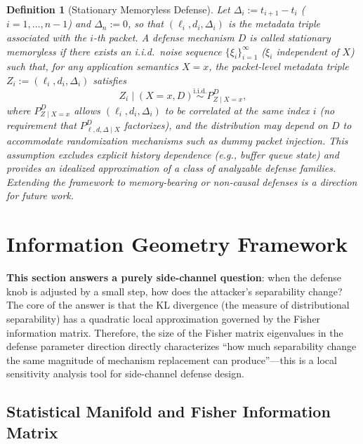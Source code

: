 \documentclass[lettersize,journal]{IEEEtran}
\newtheorem{definition}{Definition}
\begin{document}
\begin{definition}[Stationary Memoryless Defense]\label{def:memoryless-defense}
Let $\Delta_i := t_{i+1}-t_i$ ($i=1,\dots,n-1$) and $\Delta_n:=0$, so
that $(\ell_i,d_i,\Delta_i)$ is the metadata triple associated with the
$i$-th packet.
A defense mechanism $D$ is called \emph{stationary memoryless} if there
exists an i.i.d.\ noise sequence $\{\xi_i\}_{i=1}^{\infty}$
($\xi_i$ independent of $X$) such that, for any application semantics
$X=x$, the packet-level metadata triple
$Z_i := (\ell_i,d_i,\Delta_i)$ satisfies
\begin{equation}\label{eq:iid-defense}
Z_i \mid (X=x,D) \stackrel{\mathrm{i.i.d.}}{\sim} P_{Z\mid X=x}^{D},
\end{equation}
where $P_{Z\mid X=x}^{D}$ allows $(\ell_i,d_i,\Delta_i)$ to be correlated
at the same index $i$ (no requirement that $P_{\ell,d,\Delta\mid X}^{D}$
factorizes), and the distribution may depend on $D$ to accommodate
randomization mechanisms such as dummy packet injection.
This assumption excludes explicit history dependence (e.g., buffer queue
state) and provides an idealized approximation of a class of analyzable
defense families.
Extending the framework to memory-bearing or non-causal defenses is a
direction for future work.
\end{definition}

\section{Information Geometry Framework}\label{sec:ig}

\textbf{This section answers a purely side-channel question}: when the
defense knob is adjusted by a small step, how does the attacker's
separability change?
The core of the answer is that the KL divergence (the measure of
distributional separability) has a quadratic local approximation governed
by the Fisher information matrix.
Therefore, the size of the Fisher matrix eigenvalues in the defense
parameter direction directly characterizes ``how much separability change
the same magnitude of mechanism replacement can produce''---this is a
local sensitivity analysis tool for side-channel defense design.

\subsection{Statistical Manifold and Fisher Information Matrix}
\end{document}

